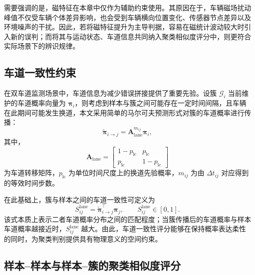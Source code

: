 \documentclass{xdupgthesis}
\begin{document}
需要强调的是，磁特征在本章中仅作为辅助约束使用。其原因在于，车辆磁场扰动峰值不仅受车辆个体差异影响，也会受到车辆横向位置变化、传感器节点差异以及环境噪声的干扰。因此，若将磁特征提升为主导判据，容易在磁统计波动较大时引入新的误判；而将其与运动状态、车道信息共同纳入聚类相似度评分中，则更符合实际场景下的辨识规律。

\subsection{车道一致性约束}

在双车道监测场景中，车道信息为减少错误拼接提供了重要先验。设簇 $\mathcal{G}_i$ 当前维护的车道概率向量为 $\boldsymbol{\pi}_i$，则考虑到样本与簇之间可能存在一定时间间隔，且车辆在此期间可能发生换道，本文采用简单的马尔可夫预测形式对簇的车道概率进行传播：
\begin{equation}
	\tilde{\boldsymbol{\pi}}_{i\rightarrow j}
	=
	\mathbf{A}_{\mathrm{lane}}^{m_{ij}}
	\boldsymbol{\pi}_i,
\end{equation}
其中，
\begin{equation}
	\mathbf{A}_{\mathrm{lane}}
	=
	\begin{bmatrix}
		1-p_{\mathrm{lc}} & p_{\mathrm{lc}}\\
		p_{\mathrm{lc}} & 1-p_{\mathrm{lc}}
	\end{bmatrix}
\end{equation}
为车道转移矩阵，$p_{\mathrm{lc}}$ 为单位时间尺度上的换道先验概率，$m_{ij}$ 为由 $\Delta t_{ij}$ 对应得到的等效时间步数。

在此基础上，簇与样本之间的车道一致性可定义为
\begin{equation}
	S_{ij}^{\mathrm{lane}}
	=
	\tilde{\boldsymbol{\pi}}_{i\rightarrow j}^{\top}
	\boldsymbol{\pi}_j,
	\qquad
	S_{ij}^{\mathrm{lane}}\in[0,1].
\end{equation}
该式本质上表示二者车道概率分布之间的匹配程度；当簇传播后的车道概率与样本车道概率越接近时，$S_{ij}^{\mathrm{lane}}$ 越大。由此，车道一致性评分能够在保持概率表达柔性的同时，为聚类判别提供具有物理意义的空间约束。

\subsection{样本--样本与样本--簇的聚类相似度评分}
\end{document}
